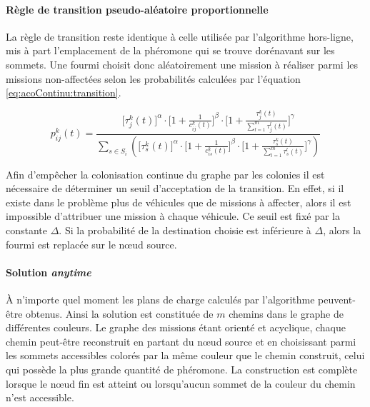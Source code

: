 \paragraph{Règle de transition pseudo-aléatoire proportionnelle}

La règle de transition reste identique à celle utilisée par l'algorithme hors-ligne, mis à part l'emplacement de la phéromone qui se trouve dorénavant sur les sommets. Une fourmi choisit donc aléatoirement une mission à réaliser parmi les missions non-affectées selon les probabilités calculées par l'équation \ref{eq:acoContinu:transition}. 

\begin{equation} \label{eq:acoContinu:transition}
 p^k_{ij}(t) = \frac{\bigg[\tau^k_{j}(t)\bigg]^\alpha \cdot \bigg[1 + \frac{1}{c^k_{ij}(t)}\bigg]^\beta \cdot \bigg[1 + \frac{\tau^k_{j}(t)}{\sum \limits_{l=1}^{m} \tau^l_{j}(t)}\bigg]^\gamma}
 {\sum \limits_{s \in S_i} \left(\bigg[\tau^k_{s}(t)\bigg]^\alpha \cdot \bigg[1 + \frac{1}{c^k_{is}(t)}\bigg]^\beta \cdot \bigg[1 + \frac{\tau^k_{s}(t)}{\sum \limits_{l=1}^{m} \tau^l_{s}(t)}\bigg]^\gamma\right)}
\end{equation}

Afin d'empêcher la colonisation continue du graphe par les colonies il est nécessaire de déterminer un seuil d'acceptation de la transition. En effet, si il existe dans le problème plus de véhicules que de missions à affecter, alors il est impossible d'attribuer une mission à chaque véhicule. Ce seuil est fixé par la constante $\Delta$. Si la probabilité de la destination choisie est inférieure à $\Delta$, alors la fourmi est replacée sur le n\oe{}ud source.

\paragraph{Solution \textit{anytime}}

À n'importe quel moment les plans de charge calculés par l'algorithme peuvent-être obtenus. Ainsi la solution est constituée de $m$ chemins dans le graphe de différentes couleurs. Le graphe des missions étant orienté et acyclique, chaque chemin peut-être reconstruit en partant du n\oe{}ud source et en choisissant parmi les sommets accessibles colorés par la même couleur que le chemin construit, celui qui possède la plus grande quantité de phéromone. La construction est complète lorsque le n\oe{}ud fin est atteint ou lorsqu'aucun sommet de la couleur du chemin n'est accessible.

